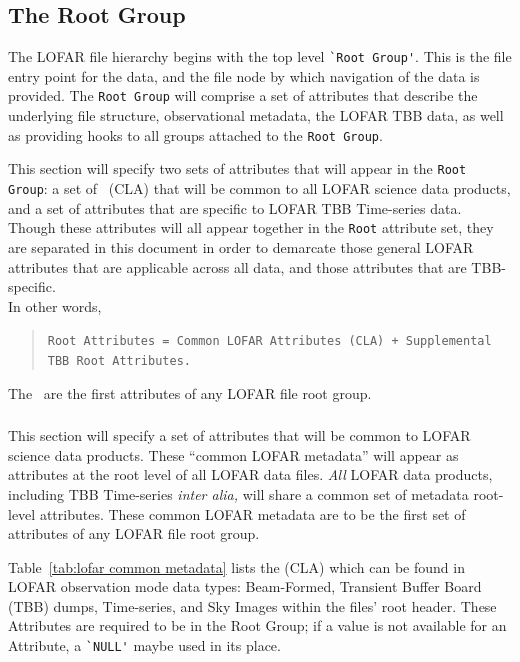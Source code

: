 \documentclass[a4paper,10pt,bibtotoc]{scrartcl}
\begin{document}


\subsection{The Root Group}
\label{sec:root group}

The LOFAR file hierarchy begins with the top level \verb|`Root Group'|.  This is
the file entry point for the data, and the file node by which navigation of
the data is provided. The \texttt{Root Group} will comprise a set of attributes
that describe the underlying file structure, observational metadata, the LOFAR
TBB data, as well as providing hooks to all groups attached to the \texttt{Root
  Group}.

This section will specify two sets of attributes that will appear in
the \texttt{Root Group}: a set of \cla\ (CLA) that will be common to
all LOFAR science data products, and a set of attributes that are
specific to LOFAR TBB Time-series data.  Though these attributes will
all appear together in the \texttt{Root} attribute set, they are
separated in this document in order to demarcate those general LOFAR
attributes that are applicable across all data, and those attributes
that are TBB-specific.\\
In other words,

\begin{verse}
\verb|Root Attributes = Common LOFAR Attributes (CLA) + Supplemental TBB Root Attributes.|
\end{verse}

The \cla\ are the first attributes of any LOFAR file root group.

\subsubsection{\cla}
\label{sec:common lofar attributes}

This section will specify a set of attributes that will be common to
LOFAR science data products.  These ``common LOFAR metadata'' will
appear as attributes at the root level of all LOFAR data files.
\textit{All} LOFAR data products, including TBB Time-series
\textit{inter alia,} will share a common set of metadata root-level
attributes.  These common LOFAR metadata are to be the first set of
attributes of any LOFAR file root group.

Table~\ref{tab:lofar common metadata} lists the {\cla} (CLA) which can
be found in LOFAR observation mode data types: Beam-Formed, Transient
Buffer Board (TBB) dumps, Time-series, and Sky Images within the
files' root header. These Attributes are required to be in the Root
Group; if a value is not available for an Attribute, a \verb|`NULL'|
maybe used in its place.
\end{document}
